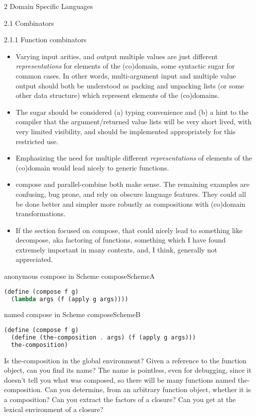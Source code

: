 \documentclass[12pt]{PalisadesLakesBook}
\begin{document}
\begin{plSection}{2 Domain Specific Languages}
\begin{plSection}{2.1 Combinators}
\begin{plSection}{2.1.1 Function combinators}
\begin{itemize}
  \item Varying input arities, and output multiple values
  are just different \emph{representations} for elements
  of the (co)domain, some syntactic sugar for common cases.
  In other words, multi-argument input and multiple value output
  should both be understood as packing and unpacking lists
  (or some other data structure) which represent elements of the
  (co)domains. 
  \item The sugar should be considered (a) typing convenience
  and (b) a hint to the compiler that the argument/returned value
  lists will be very short lived, with very limited visibility,
  and should be implemented appropriately for this restricted use.
  \item Emphasizing the need for multiple different 
  \emph{representations} of elements of the (co)domain
  would lead nicely to generic functions. 
  \item {\schemeFont compose}  and {\schemeFont parallel-combine}
  both make sense. The remaining examples are confusing,
  bug prone, and rely on obscure language features.
  They could all be done better and simpler more robustly
  as compositions with (co)domain transformations.
  \item If the section focused on {\schemeFont compose},
  that could nicely lead to something like {\schemeFont decompose},
  aka factoring of functions, something which I have found
  extremely important in many contexts, and, I think,
  generally not appreciated.
\end{itemize}

\begin{plListing}
{anonymous {\schemeFont compose} in Scheme}
{composeSchemeA}
\begin{lstlisting}[language=scheme]
(define (compose f g)
  (lambda args (f (apply g args))))
\end{lstlisting}
\end{plListing}

\begin{plListing}
{named {\schemeFont compose} in Scheme}
{composeSchemeB}
\begin{lstlisting}[language=scheme]
(define (compose f g)
  (define (the-composition . args) (f (apply g args)))
  the-composition)
\end{lstlisting}
\end{plListing}

Is {\schemeFont the-composition} in the global environment?
Given a reference to the function object, can you find its name?
The name is pointless, even for debugging,
since it doesn't tell you what was composed,
so there will be many functions named 
{\schemeFont the-composition}.
Can you determine, from an arbitrary function object,
whether it is a composition?
Can you extract the factors of a closure?
Can you get at the lexical environment of a closure?


\end{plSection}
\end{plSection}
\end{plSection}
\end{document}

